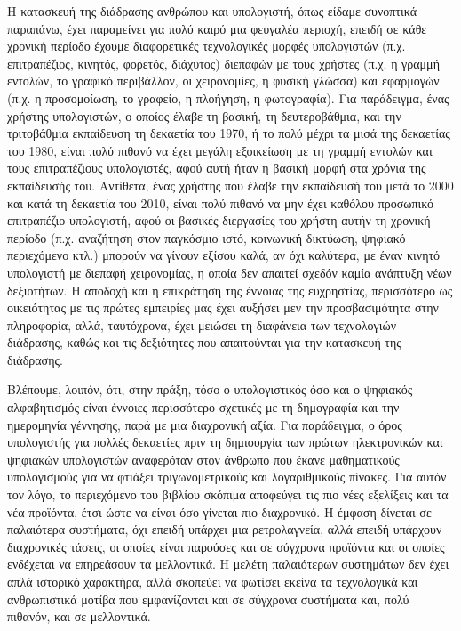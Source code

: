 \documentclass[
]{article}
\begin{document}
Η κατασκευή της διάδρασης ανθρώπου και υπολογιστή, όπως είδαμε συνοπτικά
παραπάνω, έχει παραμείνει για πολύ καιρό μια φευγαλέα περιοχή, επειδή σε
κάθε χρονική περίοδο έχουμε διαφορετικές τεχνολογικές μορφές υπολογιστών
(π.χ. επιτραπέζιος, κινητός, φορετός, διάχυτος) διεπαφών με τους χρήστες
(π.χ. η γραμμή εντολών, το γραφικό περιβάλλον, οι χειρονομίες, η φυσική
γλώσσα) και εφαρμογών (π.χ. η προσομοίωση, το γραφείο, η πλοήγηση, η
φωτογραφία). Για παράδειγμα, ένας χρήστης υπολογιστών, ο οποίος έλαβε τη
βασική, τη δευτεροβάθμια, και την τριτοβάθμια εκπαίδευση τη δεκαετία του
1970, ή το πολύ μέχρι τα μισά της δεκαετίας του 1980, είναι πολύ πιθανό
να έχει μεγάλη εξοικείωση με τη γραμμή εντολών και τους επιτραπέζιους
υπολογιστές, αφού αυτή ήταν η βασική μορφή στα χρόνια της εκπαίδευσής
του. Αντίθετα, ένας χρήστης που έλαβε την εκπαίδευσή του μετά το 2000
και κατά τη δεκαετία του 2010, είναι πολύ πιθανό να μην έχει καθόλου
προσωπικό επιτραπέζιο υπολογιστή, αφού οι βασικές διεργασίες του χρήστη
αυτήν τη χρονική περίοδο (π.χ. αναζήτηση στον παγκόσμιο ιστό, κοινωνική
δικτύωση, ψηφιακό περιεχόμενο κτλ.) μπορούν να γίνουν εξίσου καλά, αν
όχι καλύτερα, με έναν κινητό υπολογιστή με διεπαφή χειρονομίας, η οποία
δεν απαιτεί σχεδόν καμία ανάπτυξη νέων δεξιοτήτων. Η αποδοχή και η
επικράτηση της έννοιας της ευχρηστίας, περισσότερο ως οικειότητας με τις
πρώτες εμπειρίες μας έχει αυξήσει μεν την προσβασιμότητα στην
πληροφορία, αλλά, ταυτόχρονα, έχει μειώσει τη διαφάνεια των τεχνολογιών
διάδρασης, καθώς και τις δεξιότητες που απαιτούνται για την κατασκευή
της διάδρασης.

Βλέπουμε, λοιπόν, ότι, στην πράξη, τόσο ο υπολογιστικός όσο και ο
ψηφιακός αλφαβητισμός είναι έννοιες περισσότερο σχετικές με τη
δημογραφία και την ημερομηνία γέννησης, παρά με μια διαχρονική αξία. Για
παράδειγμα, ο όρος υπολογιστής για πολλές δεκαετίες πριν τη δημιουργία
των πρώτων ηλεκτρονικών και ψηφιακών υπολογιστών αναφερόταν στον άνθρωπο
που έκανε μαθηματικούς υπολογισμούς για να φτιάξει τριγωνομετρικούς και
λογαριθμικούς πίνακες. Για αυτόν τον λόγο, το περιεχόμενο του βιβλίου
σκόπιμα αποφεύγει τις πιο νέες εξελίξεις και τα νέα προϊόντα, έτσι ώστε
να είναι όσο γίνεται πιο διαχρονικό. Η έμφαση δίνεται σε παλαιότερα
συστήματα, όχι επειδή υπάρχει μια ρετρολαγνεία, αλλά επειδή υπάρχουν
διαχρονικές τάσεις, οι οποίες είναι παρούσες και σε σύγχρονα προϊόντα
και οι οποίες ενδέχεται να επηρεάσουν τα μελλοντικά. Η μελέτη
παλαιότερων συστημάτων δεν έχει απλά ιστορικό χαρακτήρα, αλλά σκοπεύει
να φωτίσει εκείνα τα τεχνολογικά και ανθρωπιστικά μοτίβα που
εμφανίζονται και σε σύγχρονα συστήματα και, πολύ πιθανόν, και σε
μελλοντικά.
\end{document}

